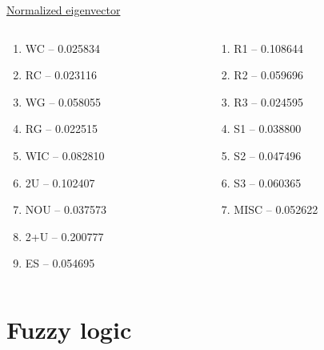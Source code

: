 \documentclass[aspectratio=1610,pdftex,dvipsnames,compress,xcolor={dvipsnames}]{beamer}
\begin{document}
\begin{frame}{\href{https://maps.app.goo.gl/Au6WsY4nKWzXmruq9}{Normalized eigenvector}}
    \begin{columns}[t]

        \begin{column}{0.50\textwidth}
            \begin{enumerate}[series=outerlist,topsep=0pt,itemsep=3pt,leftmargin=*,label=(\arabic*)]
                \item[]WC -- 0.025834   
                \item[]RC -- 0.023116
                \item[]WG -- 0.058055
                \item[]RG -- 0.022515
                \item[]WIC -- 0.082810
                \item[]2U -- 0.102407
                \item[]NOU -- 0.037573
                \item[]2+U -- 0.200777
                \item[]ES -- 0.054695
            \end{enumerate}
        \end{column}

        \begin{column}{0.50\textwidth}
            \begin{enumerate}[series=outerlist,topsep=0pt,itemsep=3pt,leftmargin=*,label=(\arabic*)]
                \item[]R1 -- 0.108644
                \item[]R2 -- 0.059696
                \item[]R3 -- 0.024595
                \item[]S1 -- 0.038800
                \item[]S2 -- 0.047496
                \item[]S3 -- 0.060365 
                \item[]MISC -- 0.052622
            \end{enumerate}
        \end{column}

    \end{columns}
\end{frame}


\section{Fuzzy logic}
\end{document}
